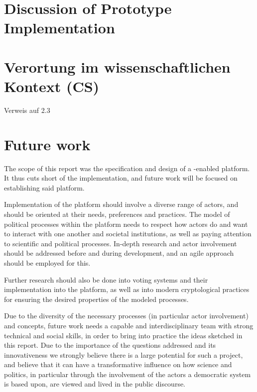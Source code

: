 \section{Discussion of Prototype Implementation}
\label{sec:DiscussionImplementation}

\section{Verortung im wissenschaftlichen Kontext (CS)}
\label{sec:DiscussionScientificContext}

Verweis auf 2.3


\section{Future work}
\label{sec:FutureWork}

The scope of this report was the specification and design of a -enabled  platform.
It thus cuts short of the implementation, and future work will be focused on establishing said platform. 

Implementation of the platform should involve a diverse range of actors, and should be oriented at their needs, preferences and practices.
The model of political processes within the platform needs to respect how actors do and want to interact with one another and societal institutions, as well as paying attention to scientific and political processes.
In-depth research and actor involvement should be addressed before and during development, and an agile approach should be employed for this. 

Further research should also be done into voting systems and their implementation into the platform, as well as into modern cryptological practices for ensuring the desired properties of the modeled processes.

Due to the diversity of the necessary processes (in particular actor involvement) and concepts, future work needs a capable and interdisciplinary team with strong technical and social skills, in order to bring into practice the ideas sketched in this report.
Due to the importance of the questions addressed and its innovativeness we strongly believe there is a large potential for such a project, and believe that it can have a transformative influence on how science and  politics, in particular through the involvement of the actors a democratic system is based upon, are viewed and lived in the public discourse.